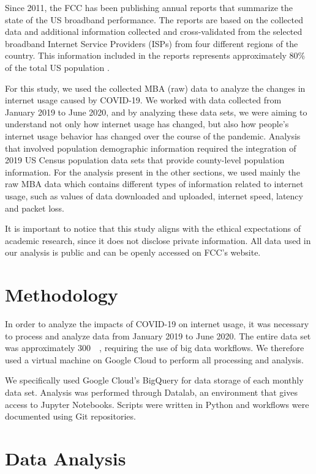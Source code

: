 \documentclass[conference,10pt]{IEEEtran}
\begin{document}
Since 2011, the FCC has been publishing annual reports that summarize the state of the US broadband performance. The reports are based on the collected data and additional information collected and cross-validated from the selected broadband Internet Service Providers (ISPs) from four different regions of the country. This information included in the reports represents approximately 80\% of the total US population \cite{mba-studies}.

For this study, we used the collected MBA (raw) data to analyze the changes in internet usage caused by COVID-19. We worked with data collected from January 2019 to June 2020, and by analyzing these data sets, we were aiming to understand not only how internet usage has changed, but also how people's internet usage behavior has changed over the course of the pandemic.  Analysis that involved population demographic information required the integration of 2019 US Census population data sets that provide county-level population information. For the analysis present in the other sections, we used mainly the raw MBA data which contains different types of information related to internet usage, such as values of data downloaded and uploaded, internet speed, latency and packet loss.

It is important to notice that this study aligns with the ethical expectations of academic research, since it does not disclose private information. All data used in our analysis is public and can be openly accessed on FCC's website.

\section{Methodology}
\label{sec:methodology}

In order to analyze the impacts of COVID-19 on internet usage, it was necessary to process and analyze data from January 2019 to June 2020. The entire data set was approximately \SI{300}{\giga\byte}, requiring the use of big data workflows. We therefore used a virtual machine on Google Cloud to perform all processing and analysis.

We specifically used Google Cloud's BigQuery for data storage of each monthly data set. Analysis was performed through Datalab, an environment that gives access to Jupyter Notebooks. Scripts were written in Python and workflows were documented using Git repositories. 



\section{Data Analysis}
\label{sec:data-analysis}

\end{document}
